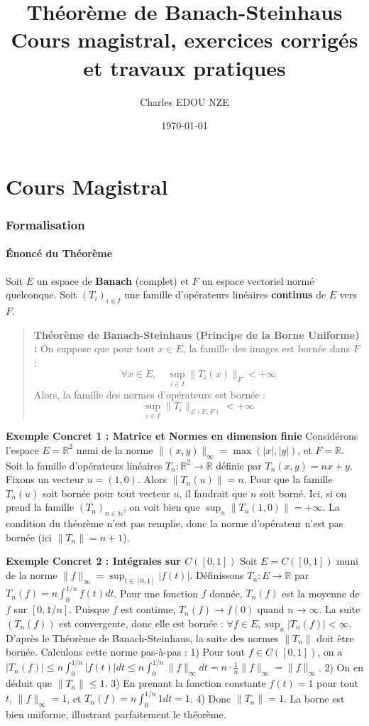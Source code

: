 \documentclass[11pt,a4paper]{article}
\title{\Huge Théorème de Banach-Steinhaus \\ \large Cours magistral, exercices corrigés et travaux pratiques}
\author{\Large Charles EDOU NZE}
\date{\today}
\begin{document}
\maketitle
\tableofcontents
\newpage

\part{Cours Magistral}



\section{Formalisation}

\subsection{Énoncé du Théorème}

Soit $E$ un espace de \textbf{Banach} (complet) et $F$ un espace vectoriel normé quelconque.
Soit $(T_i)_{i \in I}$ une famille d'opérateurs linéaires \textbf{continus} de $E$ vers $F$.
\begin{quote} \textbf{Théorème de Banach-Steinhaus (Principe de la Borne Uniforme) :}
 On suppose que pour tout $x \in E$, la famille des images est bornée dans $F$ :
 $$\forall x \in E, \quad \sup_{i \in I} \|T_i(x)\|_F < +\infty$$
 Alors, la famille des normes d'opérateurs est bornée :
 $$\sup_{i \in I} \|T_i\|_{\mathcal{L}(E,F)} < +\infty$$ \end{quote}


\textbf{Exemple Concret 1 : Matrice et Normes en dimension finie}
Considérons l'espace $E = \mathbb{R}^2$ muni de la norme $\| (x, y) \|_\infty = \max(|x|, |y|)$, et $F = \mathbb{R}$.
Soit la famille d'opérateurs linéaires $T_n : \mathbb{R}^2 \to \mathbb{R}$ définie par $T_n(x, y) = n x + y$.
Fixons un vecteur $u = (1, 0)$. Alors $\| T_n(u) \| = n$.
Pour que la famille $T_n(u)$ soit bornée pour tout vecteur $u$, il faudrait que $n$ soit borné.
Ici, si on prend la famille $(T_n)_{n \in \mathbb{N}}$, on voit bien que $\sup_{n} \| T_n(1,0) \| = +\infty$.
La condition du théorème n'est pas remplie, donc la norme d'opérateur n'est pas bornée (ici $\|T_n\| = n+1$).

\textbf{Exemple Concret 2 : Intégrales sur $C([0, 1])$}
Soit $E = C([0, 1])$ muni de la norme $\|f\|_\infty = \sup_{t \in [0, 1]} |f(t)|$.
Définissons $T_n : E \to \mathbb{R}$ par $T_n(f) = n \int_0^{1/n} f(t) dt$.
Pour une fonction $f$ donnée, $T_n(f)$ est la moyenne de $f$ sur $[0, 1/n]$.
Puisque $f$ est continue, $T_n(f) \to f(0)$ quand $n \to \infty$.
La suite $(T_n(f))$ est convergente, donc elle est bornée : $\forall f \in E, \sup_n |T_n(f)| < \infty$.
D'après le Théorème de Banach-Steinhaus, la suite des normes $\|T_n\|$ doit être bornée.
Calculons cette norme pas-à-pas :
1) Pour tout $f \in C([0, 1])$, on a $|T_n(f)| \le n \int_0^{1/n} |f(t)| dt \le n \int_0^{1/n} \|f\|_\infty dt = n \cdot \frac{1}{n} \|f\|_\infty = \|f\|_\infty$.
2) On en déduit que $\|T_n\| \le 1$.
3) En prenant la fonction constante $f(t) = 1$ pour tout $t$, $\|f\|_\infty = 1$, et $T_n(f) = n \int_0^{1/n} 1 dt = 1$.
4) Donc $\|T_n\| = 1$.
La borne est bien uniforme, illustrant parfaitement le théorème.
\end{document}
